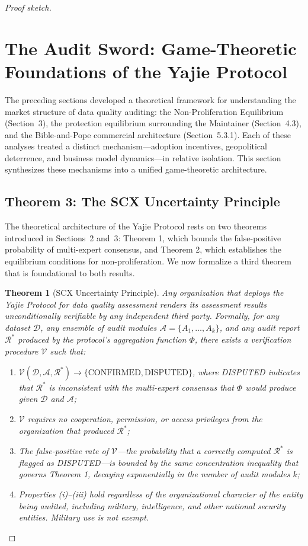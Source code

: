 \documentclass[12pt,a4paper]{ctexart}
\newtheorem{theorem}{Theorem}[section]
\theoremstyle{definition}
\theoremstyle{remark}
\begin{document}
\begin{proof}[Proof sketch]
\section{The Audit Sword: Game-Theoretic Foundations of the Yajie Protocol}

The preceding sections developed a theoretical framework for understanding the market structure of data quality auditing: the Non-Proliferation Equilibrium (Section~3), the protection equilibrium surrounding the Maintainer (Section~4.3), and the Bible-and-Pope commercial architecture (Section~5.3.1). Each of these analyses treated a distinct mechanism—adoption incentives, geopolitical deterrence, and business model dynamics—in relative isolation. This section synthesizes these mechanisms into a unified game-theoretic architecture.

\subsection{Theorem 3: The SCX Uncertainty Principle}

The theoretical architecture of the Yajie Protocol rests on two theorems introduced in Sections~2 and~3: Theorem 1, which bounds the false-positive probability of multi-expert consensus, and Theorem 2, which establishes the equilibrium conditions for non-proliferation. We now formalize a third theorem that is foundational to both results.

\begin{theorem}[SCX Uncertainty Principle]
\label{thm:scx-up}
Any organization that deploys the Yajie Protocol for data quality assessment renders its assessment results \textit{unconditionally verifiable} by any independent third party. Formally, for any dataset $\mathcal{D}$, any ensemble of audit modules $\mathcal{A} = \{A_1, \ldots, A_k\}$, and any audit report $\mathcal{R}^*$ produced by the protocol's aggregation function $\Phi$, there exists a verification procedure $\mathcal{V}$ such that:

\begin{enumerate}[label=(\roman*)]
\item $\mathcal{V}(\mathcal{D}, \mathcal{A}, \mathcal{R}^*) \to \{\text{CONFIRMED}, \text{DISPUTED}\}$, where DISPUTED indicates that $\mathcal{R}^*$ is inconsistent with the multi-expert consensus that $\Phi$ would produce given $\mathcal{D}$ and $\mathcal{A}$;
\item $\mathcal{V}$ requires no cooperation, permission, or access privileges from the organization that produced $\mathcal{R}^*$;
\item The false-positive rate of $\mathcal{V}$—the probability that a correctly computed $\mathcal{R}^*$ is flagged as DISPUTED—is bounded by the same concentration inequality that governs Theorem 1, decaying exponentially in the number of audit modules $k$;
\item Properties (i)–(iii) hold regardless of the organizational character of the entity being audited, including military, intelligence, and other national security entities. Military use is not exempt.
\end{enumerate}
\end{theorem}


\end{proof}
\end{document}
